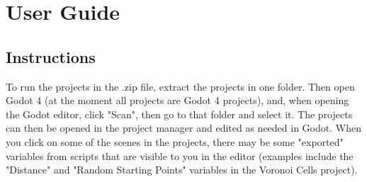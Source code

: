 \chapter{User Guide}
\section{Instructions}

To run the projects in the .zip file, extract the projects in one folder. Then open Godot 4 (at the moment all projects are Godot 4 projects), and, when opening the Godot editor, click "Scan", then go to that folder and select it. The projects can then be opened in the project manager and edited as needed in Godot. When you click on some of the scenes in the projects, there may be some "exported" variables from scripts that are visible to you in the editor (examples include the "Distance" and "Random Starting Points" variables in the Voronoi Cells project).

